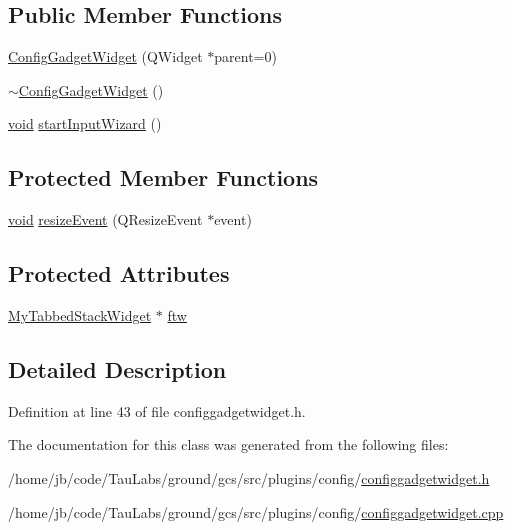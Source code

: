 \subsection*{\-Public \-Member \-Functions}
\begin{DoxyCompactItemize}
\item 
\hyperlink{group___config_plugin_gafc45c197f2917c39166b7d228d592784}{\-Config\-Gadget\-Widget} (\-Q\-Widget $\ast$parent=0)
\item 
\hyperlink{group___config_plugin_gaeafab35f30d35ed548cda276953b8ad5}{$\sim$\-Config\-Gadget\-Widget} ()
\item 
\hyperlink{group___u_a_v_objects_plugin_ga444cf2ff3f0ecbe028adce838d373f5c}{void} \hyperlink{group___config_plugin_ga8655bea31bbed90a46bacb2f428301f6}{start\-Input\-Wizard} ()
\end{DoxyCompactItemize}
\subsection*{\-Protected \-Member \-Functions}
\begin{DoxyCompactItemize}
\item 
\hyperlink{group___u_a_v_objects_plugin_ga444cf2ff3f0ecbe028adce838d373f5c}{void} \hyperlink{group___config_plugin_ga62d98ed212936a33d9e9240f27aa7497}{resize\-Event} (\-Q\-Resize\-Event $\ast$event)
\end{DoxyCompactItemize}
\subsection*{\-Protected \-Attributes}
\begin{DoxyCompactItemize}
\item 
\hyperlink{class_my_tabbed_stack_widget}{\-My\-Tabbed\-Stack\-Widget} $\ast$ \hyperlink{group___config_plugin_ga86b1da74559f7e5f1e68bf0360b06dc5}{ftw}
\end{DoxyCompactItemize}


\subsection{\-Detailed \-Description}


\-Definition at line 43 of file configgadgetwidget.\-h.



\-The documentation for this class was generated from the following files\-:\begin{DoxyCompactItemize}
\item 
/home/jb/code/\-Tau\-Labs/ground/gcs/src/plugins/config/\hyperlink{configgadgetwidget_8h}{configgadgetwidget.\-h}\item 
/home/jb/code/\-Tau\-Labs/ground/gcs/src/plugins/config/\hyperlink{configgadgetwidget_8cpp}{configgadgetwidget.\-cpp}\end{DoxyCompactItemize}
